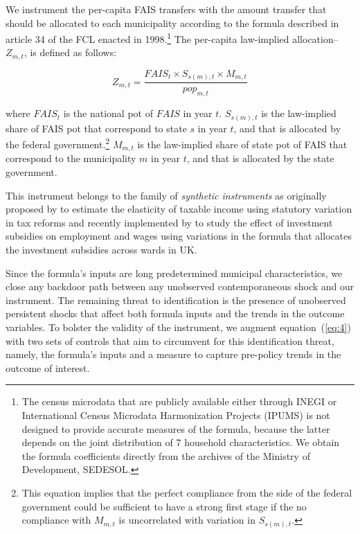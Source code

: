 \documentclass[dv_diss_main.tex]{subfiles}
\begin{document}
We instrument the per-capita FAIS transfers with the amount transfer that should be allocated to each municipality according to the formula described in article 34 of the FCL enacted in 1998.\footnote{The census microdata that are publicly available either through INEGI or International Census Microdata Harmonization Projects (IPUMS) is not designed to provide accurate measures of the formula, because the latter depends on the joint distribution of 7 household characteristics. We obtain the formula coefficients directly from the archives of the Ministry of Development, SEDESOL.} The per-capita law-implied allocation--$Z_{m,t}$, is defined as follows:

\begin{equation}\label{eq:5}
  Z_{m,t}=\frac{FAIS_t \times S_{s(m),t} \times M_{m,t}}{pop_{m,t}}
\end{equation}

\noindent where $FAIS_t$ is the national pot of $FAIS$ in year $t$.
$S_{s(m),t}$ is the law-implied share of FAIS pot that correspond to state $s$ in year $t$, and that is allocated by the federal government.\footnote{This equation implies that the perfect compliance from the side of the federal government could be sufficient to have a strong first stage if the no compliance with $M_{m,t}$ is uncorrelated with variation in $S_{s(m),t}$.} $M_{m,t}$ is the law-implied share of state pot of FAIS that correspond to the municipality $m$ in year $t$, and that is allocated by the state government.

This instrument belongs to the family of \textit{synthetic instruments} as originally proposed by \cite{gruber2002elasticity} to estimate the elasticity of taxable income using statutory variation in tax reforms and recently implemented by \cite{criscuolo2019some} to study the effect of investment subsidies on employment and wages using variations in the formula that allocates the investment subsidies across wards in UK.

Since the formula's inputs are long predetermined municipal characteristics, we close any backdoor path between any unobserved contemporaneous shock and our instrument. The remaining threat to identification is the presence of unobserved persistent shocks that affect both formula inputs and the trends in the outcome variables. To bolster the validity of the instrument, we augment equation~(\ref{eq:4}) with two sets of controls that aim to circumvent for this identification threat, namely, the formula's inputs and a measure to capture pre-policy trends in the outcome of interest.
\end{document}
